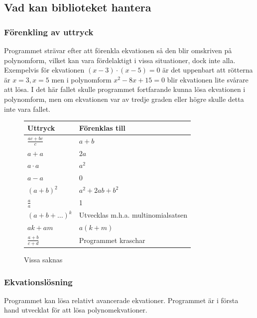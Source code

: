 \documentclass[12pt,a4paper]{article}
\begin{document}
\subsection{Vad kan biblioteket hantera}
\subsubsection{Förenkling av uttryck}
Programmet strävar efter att förenkla ekvationen så den blir omskriven på polynomform, vilket kan vara fördelaktigt i vissa situationer, dock inte alla. Exempelvis för ekvationen \((x-3) \cdot (x-5)=0\) är det uppenbart att rötterna är \(x=3, x=5\) men i polynomform \(x^{2}-8x+15=0\) blir ekvationen lite svårare att lösa. I det här fallet skulle programmet fortfarande kunna lösa ekvationen i polynomform, men om ekvationen var av tredje graden eller högre skulle detta inte vara fallet.
\begin{savenotes}
\begin{figure}[H]
  \centering
  \begin{tabular}{l|l}
    \textbf{Uttryck} & \textbf{Förenklas till} \\
    \hline
    \(\frac{ac + bc}{c}\) & \(a+b\) \\
    \(a+a\) & \(2a\) \\
    \(a \cdot a\) & \(a^{2}\) \\
    \(a - a\) & \(0\) \\
    \((a+b)^{2}\) & \(a^{2} + 2ab + b^{2}\) \\
    \(\frac{a}{a}\) & 1 \\
    \((a+b+\ldots)^{k}\) & Utvecklas m.h.a. multinomialsatsen \\
    \(ak+am\) & \(a(k+m)\) \\
    \(\frac{a+b}{c+d}\) & Programmet kraschar
  \end{tabular}
  \label{tab:expressions}Vissa saknas
\end{figure}
\end{savenotes}

\subsubsection{Ekvationslösning}
Programmet kan lösa relativt avancerade ekvationer. Programmet är i första hand utvecklat för att lösa polynomekvationer.
\end{document}
